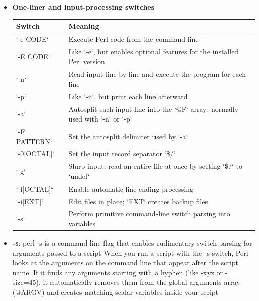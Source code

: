 \documentclass{report}
\begin{document}
    \pagebreak 
    \begin{itemize}
        \item \textbf{One-liner and input-processing switches}
            \begin{center}
            \begin{tabularx}{\textwidth}{@{}lX@{}}
                \toprule
                \textbf{Switch} & \textbf{Meaning} \\ 
                \midrule
                `-e CODE` & Execute Perl code from the command line \\[2ex]
                `-E CODE` & Like `-e`, but enables optional features for the installed Perl version \\[2ex]
                `-n` & Read input line by line and execute the program for each line \\[2ex]
                `-p` & Like `-n`, but print each line afterward \\[2ex]
                `-a` & Autosplit each input line into the `@F` array; normally used with `-n` or `-p` \\[2ex]
                `-F PATTERN` & Set the autosplit delimiter used by `-a` \\[2ex]
                `-0[OCTAL]` & Set the input record separator `\$/` \\[2ex]
                `-g` & Slurp input: read an entire file at once by setting `\$/` to `undef` \\[2ex]
                `-l[OCTAL]` & Enable automatic line-ending processing \\[2ex]
                `-i[EXT]` & Edit files in place; `EXT` creates backup files \\[2ex]
                `-s` & Perform primitive command-line switch parsing into variables \\
                \bottomrule
            \end{tabularx}
        \end{center}
        \item \textbf{-s}: perl -s is a command-line flag that enables rudimentary switch parsing for arguments passed to a script
            \bigbreak \noindent 
            When you run a script with the -s switch, Perl looks at the arguments on the command line that appear after the script name. If it finds any arguments starting with a hyphen (like -xyz or -size=45), it automatically removes them from the global arguments array (@ARGV) and creates matching scalar variables inside your script

\end{itemize}
\end{document}

